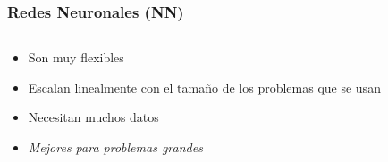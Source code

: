 \documentclass[aspectratio=43,spanish]{beamer}
\begin{document}
  \begin{frame}
      \frametitle{Redes Neuronales (NN)}

      \begin{columns}
            \begin{column}{0.5\textwidth}
                  \begin{itemize}
                        \item Son muy flexibles
                        \item Escalan linealmente con el tamaño de los problemas que se usan
                  \end{itemize}
                  \begin{itemize}
                        \item Necesitan muchos datos
                        \item \emph{Mejores para problemas grandes}
                  \end{itemize}
                  
            \end{column}
            \begin{column}{0.5\textwidth}  %
                \begin{center}
                  \scalebox{.75}{
                  
                  }
                 \end{center}
            \end{column}
      \end{columns}

\end{frame}
\end{document}
